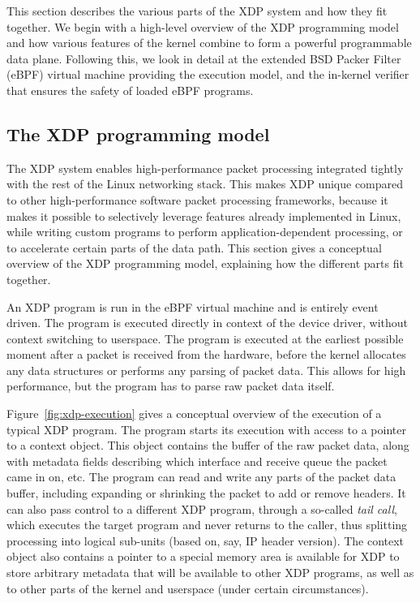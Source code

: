 \documentclass[10pt,sigconf]{acmart}
\begin{document}
This section describes the various parts of the XDP system and how they fit
together. We begin with a high-level overview of the XDP programming model and
how various features of the kernel combine to form a powerful programmable data
plane. Following this, we look in detail at the extended BSD Packer Filter
(eBPF) virtual machine providing the execution model, and the in-kernel verifier
that ensures the safety of loaded eBPF programs.

\subsection{The XDP programming model}
\label{sec:prog-model}
The XDP system enables high-performance packet processing integrated tightly
with the rest of the Linux networking stack. This makes XDP unique compared to
other high-performance software packet processing frameworks, because it makes
it possible to selectively leverage features already implemented in Linux, while
writing custom programs to perform application-dependent processing, or to
accelerate certain parts of the data path. This section gives a conceptual
overview of the XDP programming model, explaining how the different parts fit
together.

An XDP program is run in the eBPF virtual machine and is entirely event driven.
The program is executed directly in context of the device driver, without
context switching to userspace. The program is executed at the earliest possible
moment after a packet is received from the hardware, before the kernel allocates
any data structures or performs any parsing of packet data. This allows for high
performance, but the program has to parse raw packet data itself.

Figure~\ref{fig:xdp-execution} gives a conceptual overview of the execution of a
typical XDP program. The program starts its execution with access to a pointer
to a context object. This object contains the buffer of the raw packet data,
along with metadata fields describing which interface and receive queue the
packet came in on, etc. The program can read and write any parts of the packet
data buffer, including expanding or shrinking the packet to add or remove
headers. It can also pass control to a different XDP program, through a
so-called \emph{tail call}, which executes the target program and never returns
to the caller, thus splitting processing into logical sub-units (based on, say,
IP header version). The context object also contains a pointer to a special
memory area is available for XDP to store arbitrary metadata that will be
available to other XDP programs, as well as to other parts of the kernel and
userspace (under certain circumstances).
\end{document}
